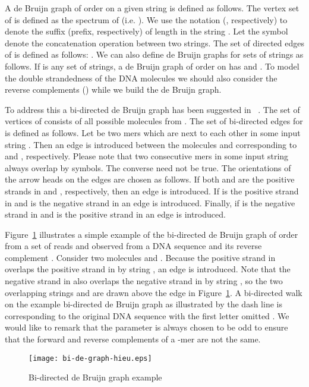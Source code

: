 \documentclass[11pt,conference,twocolumn]{IEEEtran}
\begin{document}
A de Bruijn graph  of order  on a given string  is defined as follows. 
The vertex set  of  is defined as the spectrum of  (i.e. ). 
We use the notation  (, respectively) to denote the suffix (prefix, respectively) of length  in the string .
Let the symbol  denote the concatenation operation between two strings. The set of directed edges  of  
is defined as follows: . We can also define de Bruijn graphs for sets of strings as follows. If  is any set
of strings, a de Bruijn graph  of order  on  has 
and .
To model the double strandedness of the DNA molecules we should also consider the reverse 
complements () while we build the de Bruijn graph. 

To address this a bi-directed de Bruijn graph  has been suggested in ~\cite{bidirected_graph}. 
The set of vertices  of  consists of all possible molecules from . 
The set of bi-directed edges for  is defined as follows. Let  be two mers 
which are next to each other in some input string . Then an edge is introduced between the 
molecules  and  corresponding to  and , respectively. Please note that two consecutive mers in some input 
string always overlap by  symbols. The converse need not be true. The orientations of the arrow heads on the 
edges are chosen as follows. If both  and  are the positive strands in  and , respectively,
then an edge  
is introduced. If  is the positive strand in  and  is the negative strand in  an edge  
is introduced. Finally, if  is the negative strand in  and  is the positive strand in  an 
edge  is introduced. 

Figure~\ref{fig:bi-de-graph-hieu} illustrates a simple example of
the bi-directed de Bruijn graph of order  from a set of reads
 and  observed from a DNA
sequence  and its reverse complement .
Consider two molecules  and .
Because the positive strand  in  overlaps the positive
strand  in  by string , an edge
 is introduced. Note that the negative strand
 in  also overlaps the negative strand  in  by
string , so the two overlapping strings  and  are drawn
above the edge  in
Figure~\ref{fig:bi-de-graph-hieu}. A bi-directed walk on the example
bi-directed de Bruijn graph as illustrated by the dash line is
corresponding to the original DNA sequence with the first letter
omitted . We would like to remark that the parameter 
is always chosen to be odd to ensure that the forward and reverse
complements of a -mer are not the same.

\begin{figure}
\begin{center}
\texttt{[image: bi-de-graph-hieu.eps]}
\end{center}
\caption{Bi-directed de Bruijn graph example}
\label{fig:bi-de-graph-hieu}
\end{figure}
\end{document}
